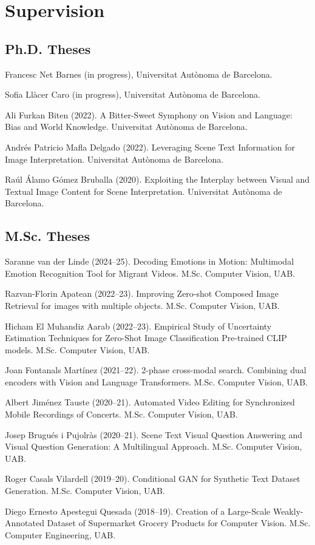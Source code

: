\documentclass[11pt]{article}
\newenvironment{entries}{%
  \begin{list}{}{\setlength{\leftmargin}{3em}\setlength{\itemindent}{-1.5em}%
    \setlength{\itemsep}{0.35em}\setlength{\parsep}{0pt}\setlength{\topsep}{0.2em}}}%
  {\end{list}}
\begin{document}
\section*{Supervision}
\subsection*{Ph.D. Theses}
\begin{entries}
\item Francesc Net Barnes (in progress), Universitat Autònoma de Barcelona.
\item Sofia Llàcer Caro (in progress), Universitat Autònoma de Barcelona.
\item Ali Furkan Biten (2022). A Bitter-Sweet Symphony on Vision and Language: Bias and World Knowledge. Universitat Autònoma de Barcelona.
\item Andrés Patricio Mafla Delgado (2022). Leveraging Scene Text Information for Image Interpretation. Universitat Autònoma de Barcelona.
\item Raúl Álamo Gómez Bruballa (2020). Exploiting the Interplay between Visual and Textual Image Content for Scene Interpretation. Universitat Autònoma de Barcelona.
\end{entries}

\subsection*{M.Sc. Theses}
\begin{entries}
\item Saranne van der Linde (2024--25). Decoding Emotions in Motion: Multimodal Emotion Recognition Tool for Migrant Videos. M.Sc. Computer Vision, UAB.
\item Razvan-Florin Apatean (2022--23). Improving Zero-shot Composed Image Retrieval for images with multiple objects. M.Sc. Computer Vision, UAB.
\item Hicham El Muhandiz Aarab (2022--23). Empirical Study of Uncertainty Estimation Techniques for Zero-Shot Image Classification Pre-trained CLIP models. M.Sc. Computer Vision, UAB.
\item Joan Fontanals Martínez (2021--22). 2-phase cross-modal search. Combining dual encoders with Vision and Language Transformers. M.Sc. Computer Vision, UAB.
\item Albert Jiménez Tauste (2020--21). Automated Video Editing for Synchronized Mobile Recordings of Concerts. M.Sc. Computer Vision, UAB.
\item Josep Brugués i Pujolràs (2020--21). Scene Text Visual Question Answering and Visual Question Generation: A Multilingual Approach. M.Sc. Computer Vision, UAB.
\item Roger Casals Vilardell (2019--20). Conditional GAN for Synthetic Text Dataset Generation. M.Sc. Computer Vision, UAB.
\item Diego Ernesto Apestegui Quesada (2018--19). Creation of a Large-Scale Weakly-Annotated Dataset of Supermarket Grocery Products for Computer Vision. M.Sc. Computer Engineering, UAB.
\end{entries}
\end{document}

